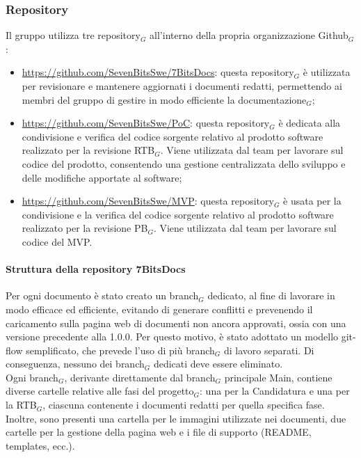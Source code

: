 \documentclass[10pt]{article}
\begin{document}
\begin{justify}
    \subsubsection{Repository}
    Il gruppo utilizza tre repository$_G$ all'interno della propria organizzazione Github$_G$:
    \begin{itemize}
        \item \href{https://github.com/SevenBitsSwe/7BitsDocs}{https://github.com/SevenBitsSwe/7BitsDocs}: questa repository$_G$ è utilizzata per revisionare e mantenere aggiornati i documenti redatti, permettendo ai membri del gruppo di gestire in modo efficiente la documentazione$_G$;
        \item \href{https://github.com/SevenBitsSwe/PoC}{https://github.com/SevenBitsSwe/PoC}: questa repository$_G$ è dedicata alla condivisione e verifica del codice sorgente relativo al prodotto software realizzato per la revisione RTB$_G$. Viene utilizzata dal team per lavorare sul codice del prodotto, consentendo una gestione centralizzata dello sviluppo e delle modifiche apportate al software;
        \item \href{https://github.com/SevenBitsSwe/MVP}{https://github.com/SevenBitsSwe/MVP}: questa repository$_G$ è usata per la condivisione e la verifica del codice sorgente relativo al prodotto software realizzato per la revisione PB$_G$. Viene utilizzata dal team per lavorare sul codice del MVP.
    \end{itemize}

        \paragraph{Struttura della repository 7BitsDocs}
        Per ogni documento è stato creato un branch$_G$ dedicato, al fine di lavorare in modo efficace ed efficiente, evitando di generare conflitti e prevenendo il caricamento sulla pagina web di documenti non ancora approvati, ossia con una versione precedente alla 1.0.0. Per questo motivo, è stato adottato un modello git-flow semplificato, che prevede l'uso di più branch$_G$ di lavoro separati. Di conseguenza, nessuno dei branch$_G$ dedicati deve essere eliminato.\\
        Ogni branch$_G$, derivante direttamente dal branch$_G$ principale Main, contiene diverse cartelle relative alle fasi del progetto$_G$: una per la Candidatura e una per la RTB$_G$, ciascuna contenente i documenti redatti per quella specifica fase. Inoltre, sono presenti una cartella per le immagini utilizzate nei documenti, due cartelle per la gestione della pagina web e i file di supporto (README, templates, ecc.).


\end{justify}
\end{document}

